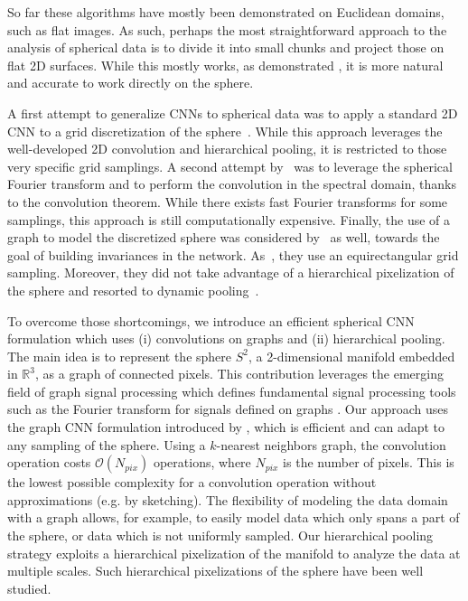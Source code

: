 \documentclass[final,twocolumn,3p,times,authoryear]{elsarticle}
\newcommand{\nati}[1]{{\color[rgb]{.1,.6,.1}{#1}}}
\newcommand{\todo}[1]{{\color[rgb]{.6,.1,.6}{#1}}}
\newcommand{\1}{\b{1}}              %
\newcommand{\0}{\b{0}}              %
\begin{document}
So far these algorithms have mostly been demonstrated on Euclidean domains, such as flat images.
As such, perhaps the most straightforward approach to the analysis of spherical data is to divide it into small chunks and project those on flat 2D surfaces.
While this mostly works, as demonstrated \todo{in ??? for example}, \nati{@Tomek, do you have a citation for that? Otherwise, we need to reformulate this.} it is more natural and accurate to work directly on the sphere.

A first attempt to generalize CNNs to spherical data was to apply a standard 2D CNN to a grid discretization of the sphere~\citep{boomsma2017spherical}. While this approach leverages the well-developed 2D convolution and hierarchical pooling, it is restricted to those very specific grid samplings.
A second attempt by~\citet{cohen2018spherical} was to leverage the spherical Fourier transform and to perform the convolution in the spectral domain, thanks to the convolution theorem. While there exists fast Fourier transforms for some samplings, this approach is still computationally expensive.
Finally, the use of a graph to model the discretized sphere was considered by~\citet{khasanova2017graph} as well, towards the goal of building invariances in the network. As~\citep{boomsma2017spherical}, they use an equirectangular grid sampling. Moreover, they did not take advantage of a hierarchical pixelization of the sphere and resorted to dynamic pooling~\citep{kalchbrenner2014dcnn}.

To overcome those shortcomings, we introduce an efficient spherical CNN formulation which uses (i) convolutions on graphs and (ii) hierarchical pooling. The main idea is to represent the sphere $S^2$, a 2-dimensional manifold embedded in $\mathbb{R}^3$, as a graph of connected pixels.
This contribution leverages the emerging field of graph signal processing which defines fundamental signal processing tools such as the Fourier transform for signals defined on graphs \citep{shuman2013emerging}.
Our approach uses the graph CNN formulation introduced by \citet{defferrard2016convolutional}, which is efficient and can adapt to any sampling of the sphere. Using a $k$-nearest neighbors graph, the convolution operation costs $\mathcal{O}(N_{pix})$ operations, where $N_{pix}$ is the number of pixels. This is the lowest possible complexity for a convolution operation without approximations (e.g. by sketching).
The flexibility of modeling the data domain with a graph allows, for example, to easily model data which only spans a part of the sphere, or data which is not uniformly sampled.
Our hierarchical pooling strategy exploits a hierarchical pixelization of the manifold to analyze the data at multiple scales.
Such hierarchical pixelizations of the sphere have been well studied.
\end{document}

